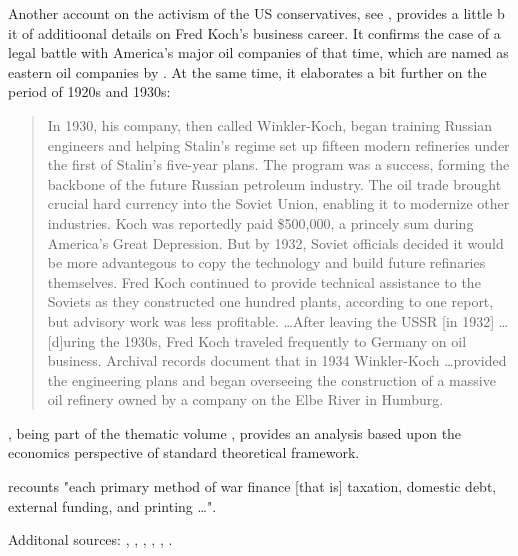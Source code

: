 Another account on the activism of the US conservatives, see \cite{mayer2020}, provides a little b it of additioonal details on Fred Koch's business career. It confirms the case of a legal battle with America's major oil companies of that time, which are named as eastern oil companies by \citeauthor{fang2013}. At the same time, it elaborates a bit further on the period of 1920s and 1930s: 

\begin{quote}
In 1930, his company, then called Winkler-Koch, began training Russian engineers and helping Stalin's regime set up fifteen modern refineries under the first of Stalin's five-year plans. The program was a success, forming the backbone of the future Russian petroleum industry. The oil trade brought crucial hard currency into the Soviet Union, enabling it to modernize other industries. Koch was reportedly paid \$500,000, a princely sum during America's Great Depression. But by 1932, Soviet officials decided it would be more advantegous to copy the technology and build future refinaries themselves. Fred Koch continued to provide technical assistance to the Soviets as they constructed one hundred plants, according to one report, but advisory work was less profitable. \dots After leaving the USSR [in 1932] \dots [d]uring the 1930s, Fred Koch traveled frequently to Germany on oil business. Archival records document that in 1934 Winkler-Koch \dots provided the engineering plans and began overseeing the construction of a massive oil refinery owned by a company on the Elbe River in Humburg.
\cite[pp.~34-35]{mayer2020}
\end{quote}

\cite{drezner2014}, being part of the thematic volume \citep{brands2024}, provides an analysis based upon the economics perspective of standard theoretical framework. 

\citep[p.~115]{cappella2016} recounts "each primary method of war finance [that is] taxation, domestic debt, external funding, and printing \dots".

Additonal sources: \cite{steil2006}, \cite{armijo2014}, \cite{miller2007}, \cite{dobson2015}, \cite{aler1993}, \cite{polk1941}.

